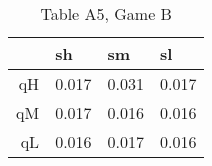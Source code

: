 \begin{table}[ht]
\centering
\begin{tabular}{rlll}
  \hline
 & sh & sm & sl \\ 
  \hline
qH & 0.017 & 0.031 & 0.017 \\ 
  qM & 0.017 & 0.016 & 0.016 \\ 
  qL & 0.016 & 0.017 & 0.016 \\ 
   \hline
\end{tabular}
\caption{Table A5, Game B} 
\end{table}

